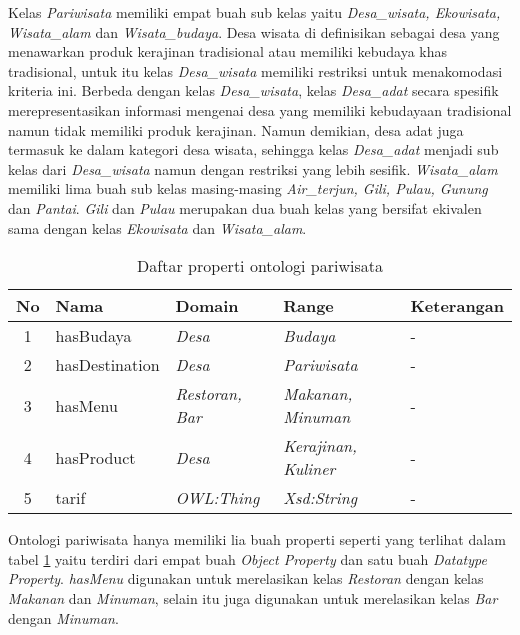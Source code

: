 Kelas \emph{Pariwisata} memiliki empat buah sub kelas yaitu \emph{Desa\_wisata, Ekowisata, Wisata\_alam} dan \emph{Wisata\_budaya}. Desa wisata di definisikan sebagai desa yang menawarkan produk kerajinan tradisional atau memiliki kebudaya khas tradisional, untuk itu kelas \emph{Desa\_wisata} memiliki restriksi untuk menakomodasi kriteria ini. Berbeda dengan kelas \emph{Desa\_wisata}, kelas \emph{Desa\_adat} secara spesifik merepresentasikan informasi mengenai desa yang memiliki kebudayaan tradisional namun tidak memiliki produk kerajinan. Namun demikian, desa adat juga termasuk ke dalam kategori desa wisata, sehingga kelas \emph{Desa\_adat} menjadi sub kelas dari \emph{Desa\_wisata} namun dengan restriksi yang lebih sesifik. \emph{Wisata\_alam} memiliki lima buah sub kelas masing-masing \emph{Air\_terjun, Gili, Pulau, Gunung} dan \emph{Pantai}. \emph{Gili} dan \emph{Pulau} merupakan dua buah kelas yang bersifat ekivalen sama dengan kelas \emph{Ekowisata} dan \emph{Wisata\_alam}.

\begin{table}[tb]
	\caption{Daftar properti ontologi pariwisata}
	\label{tab:ontopar_property}
	\centering

	\begin{tabularx}{\textwidth}{|c|l|l|X|X|}
	\hline

	\hline
	\textbf{No} & \textbf{Nama} & \textbf{Domain} & \textbf{Range} & \textbf{Keterangan} \\
	\hline
		1 & hasBudaya & \emph{Desa} & \emph{Budaya} & - \\
	\hline
		2 & hasDestination & \emph{Desa} & \emph{Pariwisata} & - \\
	\hline
		3 & hasMenu & \emph{Restoran, Bar} & \emph{Makanan, Minuman} & - \\
	\hline
		4 & hasProduct & \emph{Desa} & \emph{Kerajinan, Kuliner} & - \\
	\hline
		5 & tarif & \emph{OWL:Thing} & \emph{Xsd:String} & - \\
	\hline
	\end{tabularx}
\end{table}

Ontologi pariwisata hanya memiliki lia buah properti seperti yang terlihat dalam tabel \ref{tab:ontopar_property} yaitu terdiri dari empat buah \emph{Object Property} dan satu buah \emph{Datatype Property}. \emph{hasMenu} digunakan untuk merelasikan kelas \emph{Restoran} dengan kelas \emph{Makanan} dan \emph{Minuman}, selain itu juga digunakan untuk merelasikan kelas \emph{Bar} dengan \emph{Minuman}.

